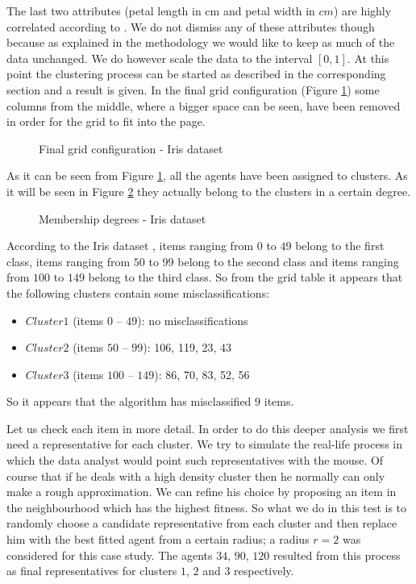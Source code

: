 The last two attributes (petal length in cm and petal width in $cm$) are highly correlated according to \cite{website:iris}. We do not dismiss any of these attributes though  because as explained in the methodology we would like to keep as much of the data unchanged. We do however scale the data to the interval $[0, 1]$. At this point the clustering process can be started as described in the corresponding section and a result is given. In the final grid configuration (Figure \ref{iris_grid}) some columns from the middle, where a bigger space can be seen, have been removed in order for the grid to fit into the page.

\begin{figure}[h!]
\centerline{}
      \caption{Final grid configuration - Iris dataset}
\label{iris_grid}
\end{figure}


As it can be seen from Figure \ref{iris_grid}, all the agents have been assigned to clusters. As it will be seen in Figure \ref{iris_membership} they actually belong to the clusters in a certain degree.

\begin{figure}[h!]
\centerline{}
      \caption{Membership degrees - Iris dataset}
\label{iris_membership}
\end{figure}


According to the Iris dataset \cite{website:iris}, items ranging from $0$ to $49$ belong to the first class, items ranging from $50$ to $99$ belong to the second class and items ranging from $100$ to $149$ belong to the third class. So from the grid table it appears that the following clusters contain some misclassifications:
\begin{itemize}
\item $Cluster1$ (items $0$ -- $49$): no misclassifications
\item $Cluster2$ (items $50$ -- $99$): 106, 119, 23, 43
\item $Cluster3$ (items $100$ -- $149$): 86, 70, 83, 52, 56
\end{itemize}
So it appears that the algorithm has misclassified $9$ items. 

Let us check each item in more detail. In order to do this deeper analysis we first need a representative for each cluster. We try to simulate the real-life process in which the data analyst would point such representatives with the mouse. Of course that if he deals with a high density cluster then he normally can only make a rough approximation. We can refine his choice by proposing an item in the neighbourhood which has the highest fitness. So what we do in this test is to randomly choose a candidate representative from each cluster and then replace him with the best fitted agent from a certain radius; a radius $r=2$ was considered for this case study.
The agents $34$, $90$, $120$ resulted from this process as final representatives for clusters $1$, $2$ and $3$ respectively.

